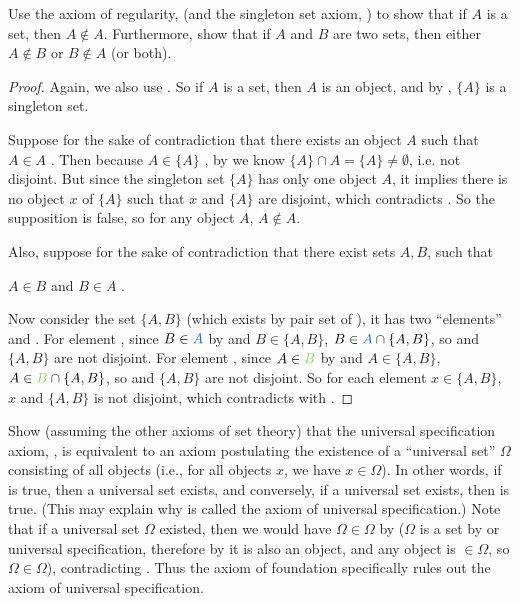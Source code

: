 \begin{exercise} \label{exercise 3.2.2}
Use the axiom of regularity,  (and the singleton set axiom, ) to show that if \(A\) is a set, then \(A \notin A\).
Furthermore, show that if \(A\) and \(B\) are two sets, then either \(A \notin B\) or \(B \notin A\) (or both).
\end{exercise}

\begin{proof}
Again, we also use . So if \(A\) is a set, then \(A\) is an object, and by , \(\{A\}\) is a singleton set.

Suppose for the sake of contradiction that there exists an object \(A\) such that \(A \in A\) .
Then because \(A \in \{A\} \) , by  we know \(\{A\} \cap A = \{A\} \neq \emptyset\), i.e. not disjoint.
But since the singleton set \( \{A\} \) has only one object \(A\), it implies there is no object \(x\) of \(\{A\}\) such that \(x\) and \( \{A\}\) are disjoint, which contradicts .
So the supposition is false, so for any object \(A\), \(A \notin A\).

Also, suppose for the sake of contradiction that there exist sets \(A, B\), such that
\begin{center}
    \(A \in B\)  and \(B \in A\) .
\end{center}
Now consider the set \(\{A, B\}\) (which exists by pair set of ), it has two ``elements''  and .
For element , since \(B \in \BLUE{A}\) by  and \(B \in \{A, B\}\), \(B \in \BLUE{A} \cap \{A, B\}\), so  and \(\{A, B\}\) are not disjoint.
For element , since \(A \in \GREEN{B}\) by  and \(A \in \{A, B\}\), \(A \in \GREEN{B} \cap \{A, B\}\), so  and \(\{A, B\}\) are not disjoint.
So for each element \(x \in \{A, B\}\), \(x\) and \(\{A, B\}\) is not disjoint, which contradicts with .
\end{proof}

\begin{exercise} \label{exercise 3.2.3}
Show (assuming the other axioms of set theory) that the universal specification axiom, , is equivalent to an axiom postulating the existence of a ``universal set'' \(\Omega\) consisting of all objects (i.e., for all objects \(x\), we have \(x \in \Omega\)).
In other words, if  is true, then a universal set exists, and conversely, if a universal set exists, then  is true.
(This may explain why  is called the axiom of universal specification.)
Note that if a universal set \(\Omega\) existed, then we would have \(\Omega \in \Omega\) by  (\(\Omega\) is a set by  or universal specification, therefore by  it is also an object, and any object is \(\in \Omega\), so \(\Omega \in \Omega\)), contradicting .
Thus the axiom of foundation specifically rules out the axiom of universal specification.
\end{exercise}

